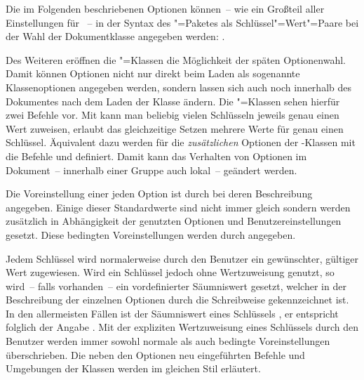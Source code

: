 Die im Folgenden beschriebenen Optionen können~-- wie ein Großteil aller 
Einstellungen für \KOMAScript~-- in der Syntax des "=Paketes 
als Schlüssel"=Wert"=Paare bei der Wahl der Dokumentklasse angegeben werden:
%
.

Des Weiteren eröffnen die \KOMAScript"=Klassen die Möglichkeit der späten 
Optionenwahl. Damit können Optionen nicht nur direkt beim Laden als sogenannte 
Klassenoptionen angegeben werden, sondern lassen sich auch noch innerhalb des 
Dokumentes nach dem Laden der Klasse ändern. Die \KOMAScript"=Klassen sehen 
hierfür zwei Befehle vor. Mit 
kann man beliebig vielen Schlüsseln jeweils genau einen Wert zuweisen, 
 erlaubt das 
gleichzeitige Setzen mehrere Werte für genau einen Schlüssel. Äquivalent 
dazu werden für die \emph{zusätzlichen} Optionen der \TUDScript-Klassen mit 
die Befehle  und 
 definiert. Damit kann
das Verhalten von Optionen im Dokument~-- innerhalb einer Gruppe auch lokal~-- 
geändert werden.

Die Voreinstellung einer jeden Option ist durch 
bei deren Beschreibung angegeben. Einige dieser Standardwerte sind nicht 
immer gleich sondern werden zusätzlich in Abhängigkeit der genutzten Optionen 
und Benutzereinstellungen gesetzt. Diese bedingten Voreinstellungen werden durch
\PValue{\,|\,}\PValue{:\,}%
 angegeben.

Jedem Schlüssel wird normalerweise durch den Benutzer ein gewünschter, gültiger 
Wert zugewiesen. Wird ein Schlüssel jedoch ohne Wertzuweisung genutzt, so 
wird~-- falls vorhanden~-- ein vordefinierter Säumniswert gesetzt, welcher in 
der Beschreibung der einzelnen Optionen durch die  
Schreibweise gekennzeichnet ist. In den allermeisten Fällen ist der Säumniswert
eines Schlüssels , er entspricht folglich der Angabe 
. Mit der expliziten Wertzuweisung 
eines Schlüssels durch den Benutzer werden immer sowohl normale als auch 
bedingte Voreinstellungen überschrieben. Die neben den Optionen neu 
eingeführten Befehle und Umgebungen der Klassen werden im gleichen Stil 
erläutert.



